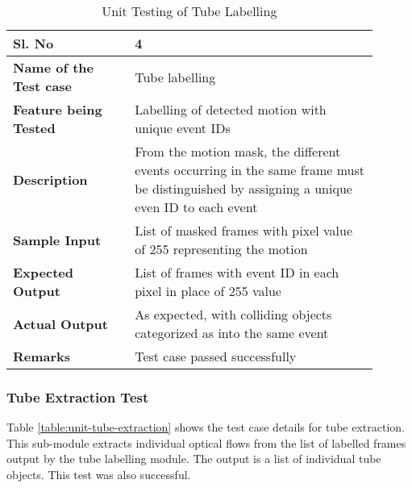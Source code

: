         \FloatBarrier
        \begin{table}[H]
            \begin{tabular}{|p{0.3\linewidth}|p{0.6\linewidth}|}
                \hline
                \textbf{Sl. No }              &\textbf{ 4}\\
                \hline
                \textbf{Name of the Test case}  & Tube labelling \\
                \hline
                \textbf{Feature being Tested}  & Labelling of detected motion with unique event IDs \\
                \hline
                \textbf{Description}           & From the motion mask, the different events occurring in the same frame must be distinguished by assigning a unique even ID to each event \\
                \hline
                \textbf{Sample Input}          & List of masked frames with pixel value of 255 representing the motion \\
                \hline
                \textbf{Expected Output}       & List of frames with event ID in each pixel in place of 255 value  \\
                \hline
                \textbf{Actual Output}         & As expected, with colliding objects categorized as into the same event \\
                \hline
                \textbf{Remarks }              & Test case passed successfully \\
                \hline
            \end{tabular}
            \caption{Unit Testing of Tube Labelling}
            \label{table:unit-tube-labelling}
        \end{table}


        \subsubsection{Tube Extraction Test}

        Table \ref{table:unit-tube-extraction} shows the test case details for tube extraction. This sub-module extracts individual optical flows from the list of labelled frames output by the tube labelling module. The output is a list of individual tube objects. This test was also successful.

